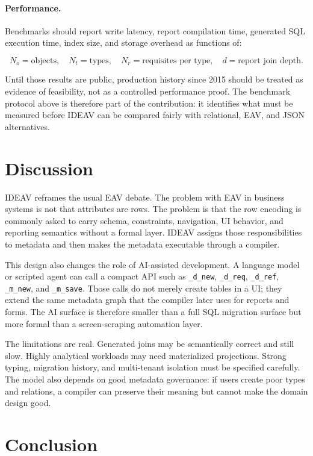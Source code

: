 \documentclass[11pt]{article}
\begin{document}
\paragraph{Performance.}
Benchmarks should report write latency, report compilation time, generated SQL
execution time, index size, and storage overhead as functions of:

\[
  N_o = \text{objects},\quad
  N_t = \text{types},\quad
  N_r = \text{requisites per type},\quad
  d = \text{report join depth}.
\]

Until those results are public, production history since 2015 should be treated
as evidence of feasibility, not as a controlled performance proof. The benchmark
protocol above is therefore part of the contribution: it identifies what must
be measured before IDEAV can be compared fairly with relational, EAV, and JSON
alternatives.

\section{Discussion}

IDEAV reframes the usual EAV debate. The problem with EAV in business systems is
not that attributes are rows. The problem is that the row encoding is commonly
asked to carry schema, constraints, navigation, UI behavior, and reporting
semantics without a formal layer. IDEAV assigns those responsibilities to
metadata and then makes the metadata executable through a compiler.

This design also changes the role of AI-assisted development. A language model
or scripted agent can call a compact API such as \texttt{\_d\_new},
\texttt{\_d\_req}, \texttt{\_d\_ref}, \texttt{\_m\_new}, and
\texttt{\_m\_save}. Those calls do not merely create tables in a UI; they extend
the same metadata graph that the compiler later uses for reports and forms. The
AI surface is therefore smaller than a full SQL migration surface but more
formal than a screen-scraping automation layer.

The limitations are real. Generated joins may be semantically correct and still
slow. Highly analytical workloads may need materialized projections. Strong
typing, migration history, and multi-tenant isolation must be specified
carefully. The model also depends on good metadata governance: if users create
poor types and relations, a compiler can preserve their meaning but cannot make
the domain design good.

\section{Conclusion}
\end{document}
